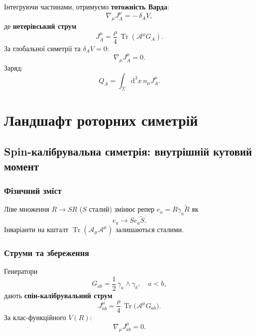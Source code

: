 \documentclass[11pt,a4paper]{article}
\numberwithin{equation}{section}
\theoremstyle{plain}
\theoremstyle{definition}
\theoremstyle{remark}
\DeclareMathOperator{\Tr}{Tr}
\newcommand{\dd}{\mathrm{d}}
\begin{document}
Інтегруючи частинами, отримуємо \textbf{тотожність Варда}:
\begin{equation}
\nabla_\mu J^\mu_A = -\,\delta_A V,
\label{eq:ward}
\end{equation}
де \textbf{нетерівський струм}
\begin{equation}
J^\mu_A = \frac{\rho}{4}\,\Tr(\mathcal{A}^\mu G_A).
\label{eq:J_general}
\end{equation}
За глобальної симетрії та $\delta_A V=0$:
\begin{equation}
\nabla_\mu J^\mu_A = 0.
\label{eq:conserved}
\end{equation}
Заряд:
\begin{equation}
Q_A = \int_\Sigma \dd^3x\, n_\mu J^\mu_A.
\label{eq:charge}
\end{equation}

\section{Ландшафт роторних симетрій}
\label{sec:catalog}

\subsection{Spin-калібрувальна симетрія: внутрішній кутовий момент}

\subsubsection{Фізичний зміст}

Ліве множення $R\to SR$ ($S$ сталий) змінює репер $e_a=R\gamma_a\widetilde{R}$ як
\begin{equation}
e_a \to Se_a\widetilde{S}.
\end{equation}
Інваріанти на кшталт $\Tr(\mathcal{A}_\mu\mathcal{A}^\mu)$ залишаються сталими.

\subsubsection{Струми та збереження}

Генератори
\begin{equation}
G_{ab} = \frac{1}{2}\,\gamma_a\wedge\gamma_b, \quad a<b,
\end{equation}
дають \textbf{спін-калібрувальний струм}
\begin{equation}
J^{\mu}_{ab} = \frac{\rho}{4}\,\Tr\!\big(\mathcal{A}^\mu G_{ab}\big).
\label{eq:spin-current}
\end{equation}
За клас-функційного $V(R)$:
\begin{equation}
\nabla_\mu J^{\mu}_{ab} = 0.
\label{eq:spin-conserved}
\end{equation}
\end{document}
